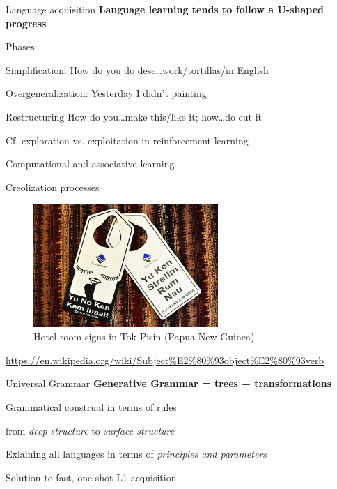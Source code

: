 \documentclass[aspectratio=169,cramped]{beamer}
\let\tempone\itemize
\let\temptwo\enditemize
\renewenvironment{itemize}{\tempone\addtolength{\itemsep}{-0\baselineskip}\addtolength{\parskip}{-0.2\baselineskip}}{\temptwo}
\newcommand{\ex}[1]{{\color{teal} #1}}
\begin{document}
\begin{frame}{Language acquisition}
	\textbf{Language learning tends to follow a U-shaped progress}
	\begin{itemize}
    \item Phases:
    \begin{itemize}
    \item Simplification: \ex{How do you do dese\ldots work/tortillas/in English}
    \item Overgeneralization: \ex{Yesterday I didn’t painting}
    \item Restructuring \ex{How do you\ldots make this/like it; how\ldots do cut it}
    \end{itemize}
  \item Cf. exploration vs. exploitation in reinforcement learning
  \item Computational and associative learning
  \end{itemize}
\end{frame}

\begin{frame}{Creolization processes}
  \vspace{-1cm}
  \begin{figure}
    \centering
    \includegraphics[width=7cm]{figures/hotel-sign.jpg}
    \caption{Hotel room signs in Tok Pisin (Papua New Guinea)}
  \end{figure}
  \vspace{-.1cm} \tiny \url{https://en.wikipedia.org/wiki/Subject\%E2\%80\%93object\%E2\%80\%93verb}
\end{frame}

\begin{frame}{Universal Grammar}
	\textbf{Generative Grammar = trees + transformations}
	\begin{itemize}
  \item Grammatical construal in terms of rules
    \begin{itemize}
    \item from \emph{deep structure} to \emph{surface structure}
    \end{itemize}
  \item Exlaining all languages in terms of \emph{principles and parameters}
    \begin{itemize}
    \item Solution to fast, one-shot L1 acquisition
    \end{itemize}
  \end{itemize}
\end{frame}
\end{document}
